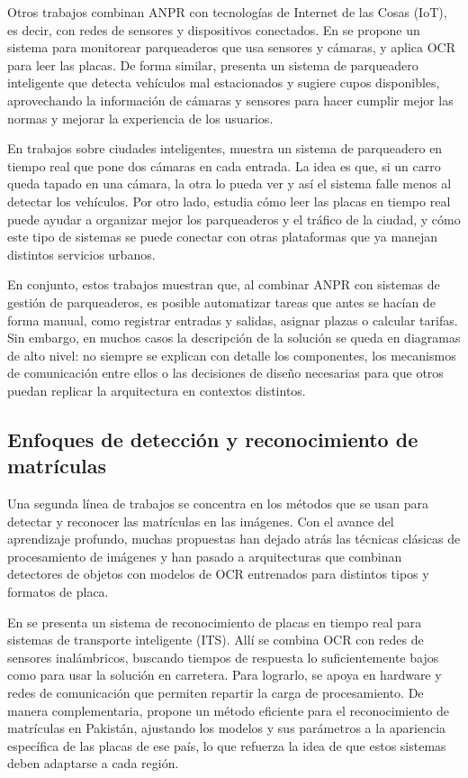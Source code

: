 Otros trabajos combinan ANPR con tecnologías de Internet de las Cosas (IoT), es decir, con redes de sensores y dispositivos conectados. En \cite{iot_parking_ocr_2023} se propone un sistema para monitorear parqueaderos que usa sensores y cámaras, y aplica OCR para leer las placas. De forma similar, \cite{smart_parking_wrongly_parked_2023} presenta un sistema de parqueadero inteligente que detecta vehículos mal estacionados y sugiere cupos disponibles, aprovechando la información de cámaras y sensores para hacer cumplir mejor las normas y mejorar la experiencia de los usuarios.

En trabajos sobre ciudades inteligentes, \cite{realtime_parking_two_cameras_2024} muestra un sistema de parqueadero en tiempo real que pone dos cámaras en cada entrada. La idea es que, si un carro queda tapado en una cámara, la otra lo pueda ver y así el sistema falle menos al detectar los vehículos. Por otro lado, \cite{smart_parking_lpr_efficiency_2024} estudia cómo leer las placas en tiempo real puede ayudar a organizar mejor los parqueaderos y el tráfico de la ciudad, y cómo este tipo de sistemas se puede conectar con otras plataformas que ya manejan distintos servicios urbanos.

En conjunto, estos trabajos muestran que, al combinar ANPR con sistemas de gestión de parqueaderos, es posible automatizar tareas que antes se hacían de forma manual, como registrar entradas y salidas, asignar plazas o calcular tarifas. Sin embargo, en muchos casos la descripción de la solución se queda en diagramas de alto nivel: no siempre se explican con detalle los componentes, los mecanismos de comunicación entre ellos o las decisiones de diseño necesarias para que otros puedan replicar la arquitectura en contextos distintos.

\subsection{Enfoques de detección y reconocimiento de matrículas}

Una segunda línea de trabajos se concentra en los métodos que se usan para detectar y reconocer las matrículas en las imágenes. Con el avance del aprendizaje profundo, muchas propuestas han dejado atrás las técnicas clásicas de procesamiento de imágenes y han pasado a arquitecturas que combinan detectores de objetos con modelos de OCR entrenados para distintos tipos y formatos de placa.

En \cite{realtime_ocr_wsn_its_2019} se presenta un sistema de reconocimiento de placas en tiempo real para sistemas de transporte inteligente (ITS). Allí se combina OCR con redes de sensores inalámbricos, buscando tiempos de respuesta lo suficientemente bajos como para usar la solución en carretera. Para lograrlo, se apoya en hardware y redes de comunicación que permiten repartir la carga de procesamiento. De manera complementaria, \cite{anpr_pakistan_2020} propone un método eficiente para el reconocimiento de matrículas en Pakistán, ajustando los modelos y sus parámetros a la apariencia específica de las placas de ese país, lo que refuerza la idea de que estos sistemas deben adaptarse a cada región.


